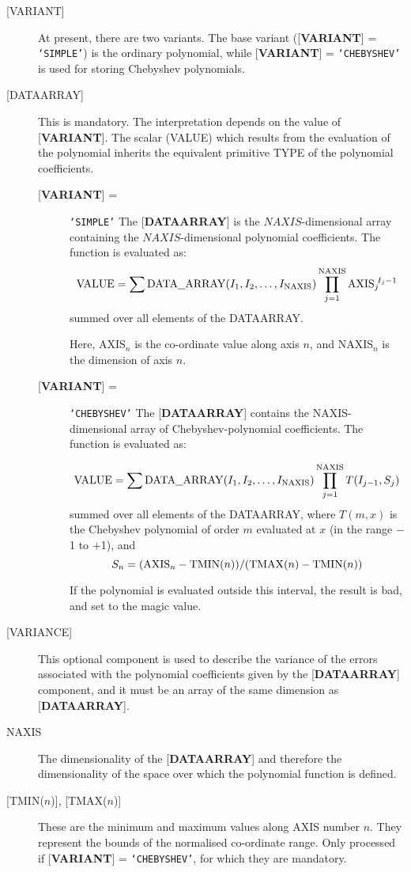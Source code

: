 \documentclass[twoside,11pt]{article}
\renewcommand{\_}{\texttt{\symbol{95}}}
\begin{document}
\begin{description}
\item [{[}VARIANT{]}] At present, there are
two variants. The base variant
({[}{\bf VARIANT}{]} = {\tt `SIMPLE'}) is the ordinary polynomial,
while
{[}{\bf VARIANT}{]} = {\tt `CHEBYSHEV'} is used
for storing Chebyshev polynomials.
\item [{[}DATA\_ARRAY{]}]  This is mandatory.  The
interpretation depends on the value
of {[}{\bf VARIANT}{]}.  The
scalar (VALUE) which results from the
evaluation of the polynomial inherits the equivalent primitive TYPE
of the polynomial coefficients.

\begin{description}
\item [{[}{\bf VARIANT}{]} =] {\tt `SIMPLE'}
The {[}{\bf DATA\_ARRAY}{]} is the $NAXIS$-dimensional array containing
the $NAXIS$-di\-men\-sion\-al poly\-no\-mial
co\-efficients.  The function is evaluated as:
\[{\rm VALUE} = \sum {\rm DATA\underline{~~}ARRAY}(I_1,I_2,\ldots,I_{\rm NAXIS}) \prod_{j=1}^{\rm NAXIS} {\rm AXIS}_j\!^{I_j-1} \]
summed over all elements of the DATA\_ARRAY.

Here, AXIS$_n$ is the co-ordinate value along axis $n$, and
NAXIS$_n$ is the dimension of axis $n$.

\item [{[}{\bf VARIANT}{]} =] {\tt `CHEBYSHEV'}
The {[}{\bf DATA\_ARRAY}{]} contains the NAXIS-dimensional
array of Chebyshev-polynomial coefficients.  The function is evaluated as: 

\[{\rm VALUE}=\sum {\rm DATA\underline{~~}ARRAY}(I_1,I_2,\ldots,I_{\rm NAXIS})\prod_{j=1}^{\rm NAXIS} T(I_{j-1},S_j) \]
summed over all elements of the DATA\_ARRAY, where
$T(m,x)$ is the Chebyshev polynomial of order $m$ evaluated at
$x$ (in the range $-$1 to $+$1),
and
\[ S_n = ({\rm AXIS}_n - {\rm TMIN}(n))/({\rm TMAX}(n) - {\rm TMIN}(n)) \]

If the polynomial is evaluated outside this interval, the result is bad, and set
to the magic value.
\end{description}
\item [{[}VARIANCE{]}]
This optional component is used to describe the variance of the
errors associated with the polynomial coefficients given
by the {[}{\bf DATA\_ARRAY}{]} component, and
it must be an array of the same
dimension as {[}{\bf DATA\_ARRAY}{]}.
\item [NAXIS]
The dimensionality of the
{[}{\bf DATA\_ARRAY}{]} and therefore the dimensionality
of the space over which the polynomial function is defined.
\item [{[}TMIN{\rm ($n$)}{]}, {[}TMAX{\rm ($n$)}{]}]
These are the minimum and maximum values along
AXIS number $n$.  They represent the bounds of the normalised
co-ordinate range.  Only processed if
{[}{\bf VARIANT}{]} = {\tt `CHEBYSHEV'}, for which they are mandatory.
\end{description}
\end{document}
